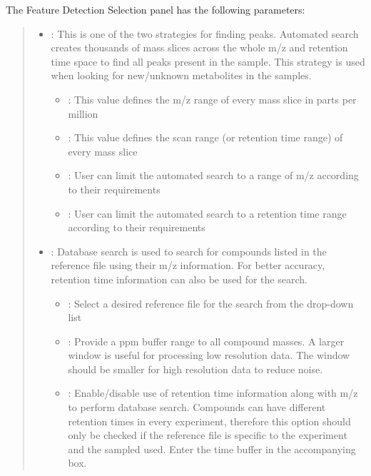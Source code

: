 \documentclass[letterpaper,10pt,english,openany,oneside]{sphinxmanual}
\begin{document}
The Feature Detection Selection panel has the following parameters:
\begin{quote}
\begin{itemize}
\item {} 
: This is one of the two strategies for finding peaks. Automated search creates thousands of mass slices across the whole m/z and retention time space to find all peaks present in the sample. This strategy is used when looking for new/unknown metabolites in the samples.
\begin{itemize}
\item {} 
: This value defines the m/z range of every mass slice in parts per million

\item {} 
: This value defines the scan range (or retention time range) of every mass slice

\item {} 
: User can limit the automated search to a range of m/z according to their requirements

\item {} 
: User can limit the automated search to a retention time range according to their requirements

\end{itemize}

\item {} 
: Database search is used to search for compounds listed in the reference file using their m/z information. For better accuracy, retention time information can also be used for the search.
\begin{itemize}
\item {} 
: Select a desired reference file for the search from the drop-down list

\item {} 
: Provide a ppm buffer range to all compound masses. A larger window is useful for processing low resolution data. The window should be smaller for high resolution data to reduce noise.

\item {} 
: Enable/disable use of retention time information along with m/z to perform database search. Compounds can have different retention times in every experiment, therefore this option should only be checked if the reference file is specific to the experiment and the sampled used. Enter the time buffer in the accompanying box.


\end{itemize}
\end{itemize}
\end{quote}
\end{document}
